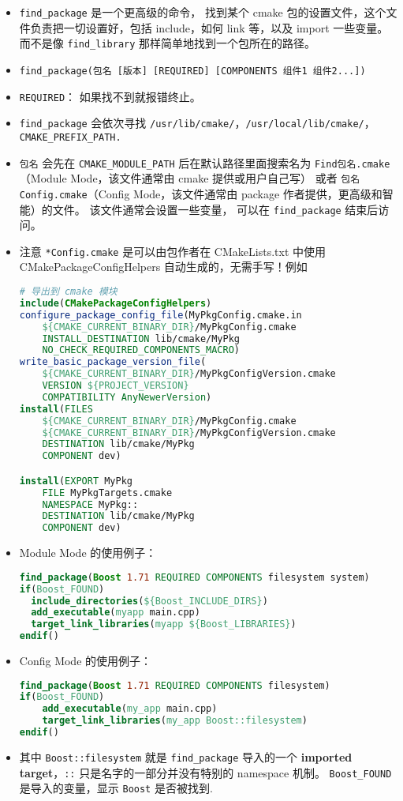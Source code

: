\begin{itemize}
\item \verb`find_package` 是一个更高级的命令， 找到某个 cmake 包的设置文件，这个文件负责把一切设置好，包括 include，如何 link 等，以及 import 一些变量。 而不是像 \verb`find_library` 那样简单地找到一个包所在的路径。
\item \verb`find_package(包名 [版本] [REQUIRED] [COMPONENTS 组件1 组件2...])`
\item \verb`REQUIRED`： 如果找不到就报错终止。
\item \verb`find_package` 会依次寻找 \verb`/usr/lib/cmake/`，\verb`/usr/local/lib/cmake/`，\verb`CMAKE_PREFIX_PATH.`
\item \verb`包名` 会先在 \verb`CMAKE_MODULE_PATH` 后在默认路径里面搜索名为 \verb`Find包名.cmake`（Module Mode，该文件通常由 cmake 提供或用户自己写） 或者 \verb`包名Config.cmake`（Config Mode，该文件通常由 package 作者提供，更高级和智能）的文件。 该文件通常会设置一些变量， 可以在 \verb`find_package` 结束后访问。
\item 注意 \verb`*Config.cmake` 是可以由包作者在 CMakeLists.txt 中使用 CMakePackageConfigHelpers 自动生成的，无需手写！例如
\begin{lstlisting}[language=cmake]
# 导出到 cmake 模块
include(CMakePackageConfigHelpers)
configure_package_config_file(MyPkgConfig.cmake.in
    ${CMAKE_CURRENT_BINARY_DIR}/MyPkgConfig.cmake
    INSTALL_DESTINATION lib/cmake/MyPkg
    NO_CHECK_REQUIRED_COMPONENTS_MACRO)
write_basic_package_version_file(
    ${CMAKE_CURRENT_BINARY_DIR}/MyPkgConfigVersion.cmake
    VERSION ${PROJECT_VERSION}
    COMPATIBILITY AnyNewerVersion)
install(FILES
    ${CMAKE_CURRENT_BINARY_DIR}/MyPkgConfig.cmake
    ${CMAKE_CURRENT_BINARY_DIR}/MyPkgConfigVersion.cmake
    DESTINATION lib/cmake/MyPkg
    COMPONENT dev)

install(EXPORT MyPkg
    FILE MyPkgTargets.cmake
    NAMESPACE MyPkg::
    DESTINATION lib/cmake/MyPkg
    COMPONENT dev)
\end{lstlisting}
\item Module Mode 的使用例子：
\begin{lstlisting}[language=cmake]
find_package(Boost 1.71 REQUIRED COMPONENTS filesystem system)
if(Boost_FOUND)
  include_directories(${Boost_INCLUDE_DIRS})
  add_executable(myapp main.cpp)
  target_link_libraries(myapp ${Boost_LIBRARIES})
endif()
\end{lstlisting}
\item Config Mode 的使用例子：
\begin{lstlisting}[language=cmake]
find_package(Boost 1.71 REQUIRED COMPONENTS filesystem)
if(Boost_FOUND)
    add_executable(my_app main.cpp)
    target_link_libraries(my_app Boost::filesystem)
endif()
\end{lstlisting}
\item 其中 \verb`Boost::filesystem` 就是 \verb`find_package` 导入的一个 \textbf{imported target}，\verb`::` 只是名字的一部分并没有特别的 namespace 机制。 \verb`Boost_FOUND` 是导入的变量，显示 \verb`Boost` 是否被找到.
\end{itemize}

